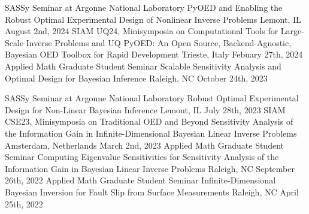 
\begin{cventries}

  \cventry
    {SASSy Seminar at Argonne National Laboratory} %
    {PyOED and Enabling the Robust Optimal Experimental Design of Nonlinear Inverse
    Problems} %
    {Lemont, IL} %
    {August 2nd, 2024} %
    {
    }
  \cventry
    {SIAM UQ24, Minisymposia on Computational Tools for Large-Scale Inverse Problems and UQ} %
    {PyOED: An Open Source, Backend-Agnostic, Bayesian OED Toolbox for Rapid Development} %
    {Trieste, Italy} %
    {Febuary 27th, 2024} %
    {
    }
  \cventry
    {Applied Math Graduate Student Seminar} %
    {Scalable Sensitivity Analysis and Optimal Design for Bayesian Inference} %
    {Raleigh, NC} %
    {October 24th, 2023} %
    {
    }

  \cventry
    {SASSy Seminar at Argonne National Laboratory} %
    {Robust Optimal Experimental Design for Non-Linear Bayesian Inference} %
    {Lemont, IL} %
    {July 28th, 2023} %
    {
    }
  \cventry
    {SIAM CSE23, Minisymposia on Traditional OED and Beyond} %
    {Sensitivity Analysis of the Information Gain in Infinite-Dimensional Bayesian Linear Inverse Problems} %
    {Amsterdam, Netherlands} %
    {March 2nd, 2023} %
    {
    }
  \cventry
    {Applied Math Graduate Student Seminar} %
    {Computing Eigenvalue Sensitivities for Sensitivity Analysis of the Information Gain in Bayesian Linear Inverse Problems} %
    {Raleigh, NC} %
    {September 26th, 2022} %
    {
    }
  \cventry
    {Applied Math Graduate Student Seminar} %
    {Infinite-Dimensional Bayesian Inversion for Fault Slip from Surface Measurements} %
    {Raleigh, NC} %
    {April 25th, 2022} %
    {
    }

\end{cventries}
